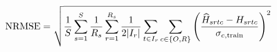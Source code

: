 \documentclass[12pt]{article}
\begin{document}
\fontsize{22}{28}\selectfont\[{\rm NRMSE}=\sqrt{\frac1S\sum_{s=1}^{S}\frac1{R_s}\sum_{r=1}^{R_s}\frac1{2|I_r|}\sum_{t\in I_r}\sum_{c\in\{O,R\}}\left(\frac{\widehat H_{srtc}-H_{srtc}}{\sigma_{c,\rm train}}\right)^2}\]
\end{document}
